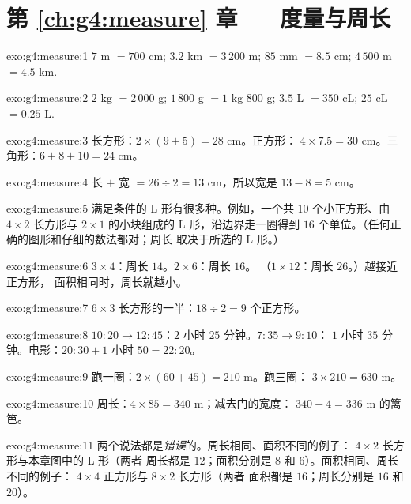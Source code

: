 \section*{第 \ref{ch:g4:measure} 章 --- 度量与周长}

\begin{solution}{exo:g4:measure:1}
$7$ m $= 700$ cm; \quad $3.2$ km $= 3\,200$ m; \quad
$85$ mm $= 8.5$ cm; \quad $4\,500$ m $= 4.5$ km.
\end{solution}

\begin{solution}{exo:g4:measure:2}
$2$ kg $= 2\,000$ g; \quad $1\,800$ g $= 1$ kg $800$ g; \quad
$3.5$ L $= 350$ cL; \quad $25$ cL $= 0.25$ L.
\end{solution}

\begin{solution}{exo:g4:measure:3}
长方形：$2 \times (9 + 5) = 28$ cm。正方形：
$4 \times 7.5 = 30$ cm。三角形：$6 + 8 + 10 = 24$ cm。
\end{solution}

\begin{solution}{exo:g4:measure:4}
长 $+$ 宽 $= 26 \div 2 = 13$ cm，所以宽是
$13 - 8 = 5$ cm。
\end{solution}

\begin{solution}{exo:g4:measure:5}
满足条件的 L 形有很多种。例如，一个共 $10$ 个小正方形、由
$4 \times 2$ 长方形与 $2 \times 1$ 的小块组成的 L 形，沿边界走一圈得到 $16$
个单位。（任何正确的图形和仔细的数法都对；周长
取决于所选的 L 形。）
\end{solution}

\begin{solution}{exo:g4:measure:6}
$3 \times 4$：周长 $14$。$2 \times 6$：周长 $16$。
（$1 \times 12$：周长 $26$。）越接近正方形，
面积相同时，周长就越小。
\end{solution}

\begin{solution}{exo:g4:measure:7}
$6 \times 3$ 长方形的一半：$18 \div 2 = 9$ 个正方形。
\end{solution}

\begin{solution}{exo:g4:measure:8}
$10{:}20 \to 12{:}45$：$2$ 小时 $25$ 分钟。$7{:}35 \to 9{:}10$：
$1$ 小时 $35$ 分钟。电影：$20{:}30 + 1$ 小时 $50 = 22{:}20$。
\end{solution}

\begin{solution}{exo:g4:measure:9}
跑一圈：$2 \times (60 + 45) = 210$ m。跑三圈：
$3 \times 210 = 630$ m。
\end{solution}

\begin{solution}{exo:g4:measure:10}
周长：$4 \times 85 = 340$ m；减去门的宽度：
$340 - 4 = 336$ m 的篱笆。
\end{solution}

\begin{solution}{exo:g4:measure:11}
两个说法都是\emph{错误}的。周长相同、面积不同的例子：
$4 \times 2$ 长方形与本章图中的 L 形（两者
周长都是 $12$；面积分别是 $8$ 和 $6$）。面积相同、周长不同的例子：
$4 \times 4$ 正方形与 $8 \times 2$ 长方形（两者
面积都是 $16$；周长分别是 $16$ 和 $20$）。
\end{solution}
